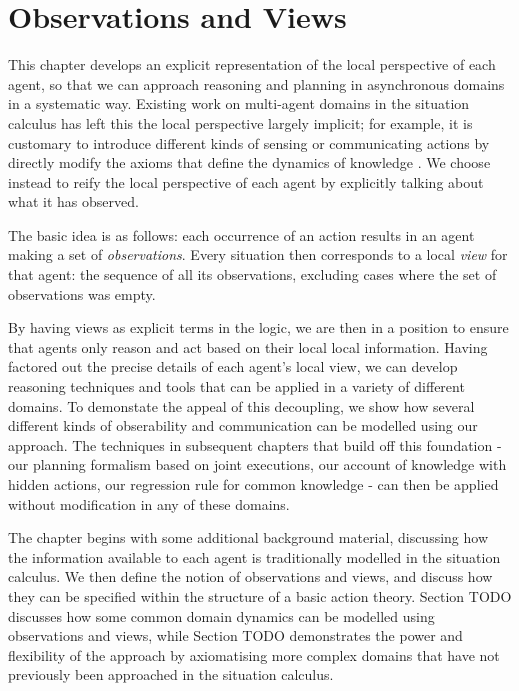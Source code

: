 

\chapter{Observations and Views}

\label{ch:observations}

This chapter develops an explicit representation of the local perspective
of each agent, so that we can approach reasoning and planning in asynchronous
domains in a systematic way. Existing work on multi-agent domains
in the situation calculus has left this the local perspective largely
implicit; for example, it is customary to introduce different kinds
of sensing or communicating actions by directly modify the axioms
that define the dynamics of knowledge \citep{scherl03sc_knowledge,Lesperance99sitcalc_approach}.
We choose instead to reify the local perspective of each agent by
explicitly talking about what it has observed.

The basic idea is as follows: each occurrence of an action results
in an agent making a set of \emph{observations}. Every situation then
corresponds to a local \emph{view} for that agent: the sequence of
all its observations, excluding cases where the set of observations
was empty.

By having views as explicit terms in the logic, we are then in a position
to ensure that agents only reason and act based on their local local
information. Having factored out the precise details of each agent's
local view, we can develop reasoning techniques and tools that can
be applied in a variety of different domains. To demonstate the appeal
of this decoupling, we show how several different kinds of obserability
and communication can be modelled using our approach. The techniques
in subsequent chapters that build off this foundation - our planning
formalism based on joint executions, our account of knowledge with
hidden actions, our regression rule for common knowledge - can then
be applied without modification in any of these domains.

The chapter begins with some additional background material, discussing
how the information available to each agent is traditionally modelled
in the situation calculus. We then define the notion of observations
and views, and discuss how they can be specified within the structure
of a basic action theory. Section TODO discusses how some common domain
dynamics can be modelled using observations and views, while Section
TODO demonstrates the power and flexibility of the approach by axiomatising
more complex domains that have not previously been approached in the
situation calculus.


